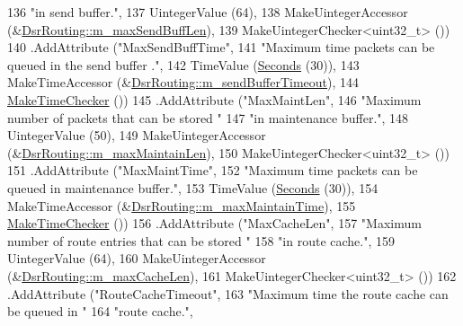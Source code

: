 \begin{DoxyCode}
136                    \textcolor{stringliteral}{"in send buffer."},
137                    UintegerValue (64),
138                    MakeUintegerAccessor (&\hyperlink{classns3_1_1dsr_1_1DsrRouting_a5cf78026e2a25a4468c04745f4a10c13}{DsrRouting::m\_maxSendBuffLen}),
139                    MakeUintegerChecker<uint32\_t> ())
140     .AddAttribute (\textcolor{stringliteral}{"MaxSendBuffTime"},
141                    \textcolor{stringliteral}{"Maximum time packets can be queued in the send buffer ."},
142                    TimeValue (\hyperlink{group__timecivil_ga33c34b816f8ff6628e33d5c8e9713b9e}{Seconds} (30)),
143                    MakeTimeAccessor (&\hyperlink{classns3_1_1dsr_1_1DsrRouting_a1f89794801db0336d92e4ca85fbc09a7}{DsrRouting::m\_sendBufferTimeout}),
144                    \hyperlink{group__time_ga7032965bd4afa578691d88c09e4481c1}{MakeTimeChecker} ())
145     .AddAttribute (\textcolor{stringliteral}{"MaxMaintLen"},
146                    \textcolor{stringliteral}{"Maximum number of packets that can be stored "}
147                    \textcolor{stringliteral}{"in maintenance buffer."},
148                    UintegerValue (50),
149                    MakeUintegerAccessor (&\hyperlink{classns3_1_1dsr_1_1DsrRouting_a65f608e0cfba00495392f94938fc02c0}{DsrRouting::m\_maxMaintainLen}),
150                    MakeUintegerChecker<uint32\_t> ())
151     .AddAttribute (\textcolor{stringliteral}{"MaxMaintTime"},
152                    \textcolor{stringliteral}{"Maximum time packets can be queued in maintenance buffer."},
153                    TimeValue (\hyperlink{group__timecivil_ga33c34b816f8ff6628e33d5c8e9713b9e}{Seconds} (30)),
154                    MakeTimeAccessor (&\hyperlink{classns3_1_1dsr_1_1DsrRouting_ac6b1dffa9665af0d6a71aa7b947962ee}{DsrRouting::m\_maxMaintainTime}),
155                    \hyperlink{group__time_ga7032965bd4afa578691d88c09e4481c1}{MakeTimeChecker} ())
156     .AddAttribute (\textcolor{stringliteral}{"MaxCacheLen"},
157                    \textcolor{stringliteral}{"Maximum number of route entries that can be stored "}
158                    \textcolor{stringliteral}{"in route cache."},
159                    UintegerValue (64),
160                    MakeUintegerAccessor (&\hyperlink{classns3_1_1dsr_1_1DsrRouting_afce2c0909aecc7dfe4528f7f6b042019}{DsrRouting::m\_maxCacheLen}),
161                    MakeUintegerChecker<uint32\_t> ())
162     .AddAttribute (\textcolor{stringliteral}{"RouteCacheTimeout"},
163                    \textcolor{stringliteral}{"Maximum time the route cache can be queued in "}
164                    \textcolor{stringliteral}{"route cache."},

\end{DoxyCode}
